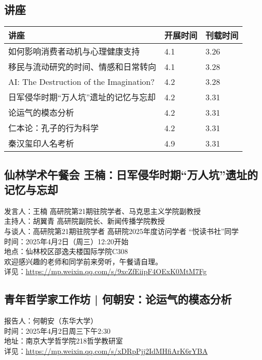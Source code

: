 \documentclass[letterpaper, 12pt]{article}
\begin{document}
\begin{multicols}{2}
\pagebreak

\section{讲座}
\begin{tabular}{|>{\centering\arraybackslash}m{}|m{}|m{}|}
    \hline
    讲座 & 开展时间 & 刊载时间\\
    \hline\hline
    如何影响消费者动机与心理健康支持 & 4.1 & 3.26\\\hline
    移民与流动研究的时间、情感和日常转向 & 4.1 & 3.28\\\hline
    AI: The Destruction of the Imagination? & 4.2 & 3.28\\\hline
    日军侵华时期“万人坑”遗址的记忆与忘却 & 4.2 & 3.31\\\hline
    论运气的模态分析 & 4.2 & 3.31\\\hline
    仁本论：孔子的行为科学 & 4.2 & 3.31\\\hline
    秦汉玺印人名考析 & 4.9 & 3.31\\\hline
\end{tabular}
\subsection{仙林学术午餐会 王楠：日军侵华时期“万人坑”遗址的记忆与忘却}
发言人：王楠 高研院第21期驻院学者、马克思主义学院副教授
\\主持人：胡翼青 高研院副院长、新闻传播学院教授
\\与谈人：高研院第21期驻院学者 高研院2025年度访问学者 “悦读书社”同学
\\时间：2025年4月2日（周三）12:20开始
\\地点：仙林校区邵逸夫楼国际学院C308
\\欢迎感兴趣的老师和同学前来旁听，午餐请自理。
\\详见：\url{https://mp.weixin.qq.com/s/9xcZfEiipF4OExK0MtM7Fg}

\subsection{青年哲学家工作坊 | 何朝安：论运气的模态分析}
报告人：何朝安（东华大学）
\\时间：2025年4月2日周三下午2:30
\\地址：南京大学哲学院218哲学教研室
\\详见：\url{https://mp.weixin.qq.com/s/xDRpPjj2IdMHfiArK6rYBA}


\end{multicols}
\end{document}
